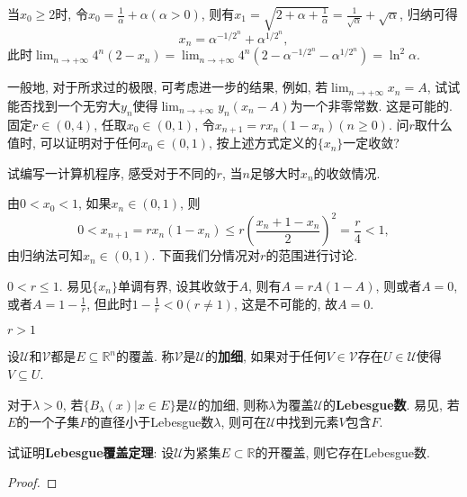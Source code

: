 \begin{quizb}
\begin{solution}
当\(x_0\geqslant 2\)时, 令\(x_0=\frac{1}{\alpha}+\alpha(\alpha>0)\), 则有\(x_1=\sqrt{2+\alpha+\frac{1}{\alpha}}=\frac{1}{\sqrt{\alpha}}+\sqrt{\alpha}\), 归纳可得\[x_n=\alpha^{-1/2^n}+\alpha^{1/2^n},\]此时\(\lim_{n\rightarrow+\infty}4^n(2-x_n)=\lim_{n\rightarrow+\infty}4^n\left(2-\alpha^{-1/2^n}-\alpha^{1/2^n}\right)=\ln^2\alpha.\)
\end{solution}
\woe 一般地, 对于所求过的极限, 可考虑进一步的结果, 例如, 若\(\lim_{n\rightarrow+\infty}x_n=A\), 试试能否找到一个无穷大\(y_n\)使得\(\lim_{n\rightarrow+\infty}y_n\left(x_n-A\right)\)为一个非零常数.
\tcbline
这是可能的.
\tcbline
\woe 固定\(r\in(0,4)\), 任取\(x_0\in(0,1)\), 令\(x_{n+1}=rx_n(1-x_n)(n\geqslant 0)\). 问\(r\)取什么值时, 可以证明对于任何\(x_0\in(0,1)\), 按上述方式定义的\(\{x_n\}\)一定收敛?
  
试编写一计算机程序, 感受对于不同的\(r\), 当\(n\)足够大时\(x_n\)的收敛情况.
\begin{solution}
由\(0<x_0<1\), 如果\(x_n\in(0,1)\), 则\[0<x_{n+1}=rx_n(1-x_n)\leqslant r\left(\frac{x_{n}+1-x_{n}}{2}\right)^2=\frac{r}{4}<1,\]
由归纳法可知\(x_n\in(0,1)\). 下面我们分情况对\(r\)的范围进行讨论.
\begin{asparaenum}[\bfseries (i)]
\item \(0<r\leqslant 1\). 易见\(\{x_n\}\)单调有界,  设其收敛于\(A\), 则有\(A=rA(1-A)\), 则或者\(A=0\), 或者\(A=1-\frac{1}{r}\), 但此时\(1-\frac{1}{r}< 0(r\ne 1)\), 这是不可能的, 故\(A=0\).
\item \(r>1\)

\end{asparaenum}
\end{solution}
\woe 设\(\mathscr{U}\)和\(\mathscr{V}\)都是\(E\subseteq \mathbb{R}^n\)的覆盖. 称\(\mathscr{V}\)是\(\mathscr{U}\)的\textbf{加细}, 如果对于任何\(V\in\mathscr{V}\)存在\(U\in\mathscr{U}\)使得\(V\subseteq U\).
  
对于\(\lambda>0\), 若\(\{B_\lambda(x)|x\in E\}\)是\(\mathscr{U}\)的加细, 则称\(\lambda\)为覆盖\(\mathscr{U}\)的\textbf{Lebesgue数}. 易见, 若\(E\)的一个子集\(F\)的直径小于Lebesgue数\(\lambda\), 则可在\(\mathscr{U}\)中找到元素\(V\)包含\(F\).
  
试证明\textbf{Lebesgue覆盖定理}: 设\(\mathscr{U}\)为紧集\(E\subset\mathbb{R}\)的开覆盖, 则它存在Lebesgue数.
\begin{proof}

\end{proof}



\end{quizb}
